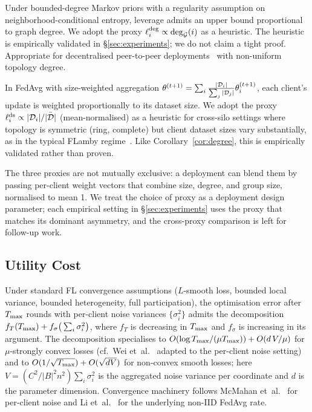 \begin{corollary}
\label{cor:degree}
Under bounded-degree Markov priors with a regularity assumption on
neighborhood-conditional entropy, leverage admits an upper bound
proportional to graph degree. We adopt the proxy
$\ell_i^{\mathrm{deg}} \propto \deg_{\mathcal{G}}(i)$ as a heuristic. The
heuristic is empirically validated in \S\ref{sec:experiments}; we do not
claim a tight proof. Appropriate for decentralised peer-to-peer
deployments~\cite{roy2019braintorrent,hegedus2021decentralized,beilharz2021dag}
with non-uniform topology degree.
\end{corollary}

\begin{corollary}
\label{cor:influence}
In FedAvg with size-weighted aggregation
$\theta^{(t+1)} = \sum_i \frac{|\mathcal{D}_i|}{\sum_j |\mathcal{D}_j|} \theta_i^{(t+1)}$,
each client's update is weighted proportionally to its dataset size.
We adopt the proxy $\ell_i^{\mathrm{ds}} \propto |\mathcal{D}_i|/\bar{|\mathcal{D}|}$
(mean-normalised) as a heuristic for cross-silo settings where topology
is symmetric (\eg ring, complete) but client dataset sizes vary
substantially, as in the typical FLamby regime~\cite{flamby2022}. Like
Corollary~\ref{cor:degree}, this is empirically validated rather than
proven.
\end{corollary}

The three proxies are not mutually exclusive: a deployment can blend
them by passing per-client weight vectors that combine size, degree,
and group size, normalised to mean 1. We treat the choice of proxy as
a deployment design parameter; each empirical setting in
\S\ref{sec:experiments} uses the proxy that matches its dominant
asymmetry, and the cross-proxy comparison is left for follow-up work.

\subsection{Utility Cost}
\label{sec:defense-utility}

\begin{proposition}
\label{prop:utility}
Under standard FL convergence assumptions ($L$-smooth loss, bounded
local variance, bounded heterogeneity, full participation), the
optimisation error after $T_{\max}$ rounds with per-client noise variances
$\{\sigma_i^2\}$ admits the decomposition
$f_T(T_{\max}) + f_\sigma\big(\sum_i \sigma_i^2\big)$,
where $f_T$ is decreasing in $T_{\max}$ and $f_\sigma$ is increasing in
its argument. The decomposition specialises to
$O(\log T_{\max} / (\mu T_{\max})) + O(d\,V/\mu)$ for $\mu$-strongly
convex losses (cf.\ Wei et~al.~\cite{wei2020nbafl} adapted to the
per-client noise setting) and to $O(1/\sqrt{T_{\max}}) + O(\sqrt{dV})$ for
non-convex smooth losses; here $V = (C^2 / |B|^2 n^2) \sum_i \sigma_i^2$
is the aggregated noise variance per coordinate and $d$ is the
parameter dimension. Convergence machinery follows
McMahan et~al.~\cite{mcmahan2018dpfedavg} for per-client noise and
Li et~al.~\cite{li2020fedavg} for the underlying non-IID FedAvg rate.
\end{proposition}

